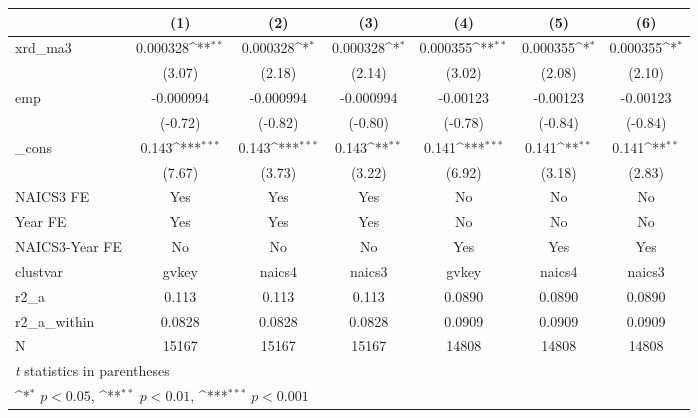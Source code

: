 {
\def\sym#1{\ifmmode^{#1}\else\(^{#1}\)\fi}
\begin{tabular}{l*{6}{c}}
\hline\hline
            &\multicolumn{1}{c}{(1)}         &\multicolumn{1}{c}{(2)}         &\multicolumn{1}{c}{(3)}         &\multicolumn{1}{c}{(4)}         &\multicolumn{1}{c}{(5)}         &\multicolumn{1}{c}{(6)}         \\
\hline
xrd\_ma3     &    0.000328\sym{**} &    0.000328\sym{*}  &    0.000328\sym{*}  &    0.000355\sym{**} &    0.000355\sym{*}  &    0.000355\sym{*}  \\
            &      (3.07)         &      (2.18)         &      (2.14)         &      (3.02)         &      (2.08)         &      (2.10)         \\
[1em]
emp         &   -0.000994         &   -0.000994         &   -0.000994         &    -0.00123         &    -0.00123         &    -0.00123         \\
            &     (-0.72)         &     (-0.82)         &     (-0.80)         &     (-0.78)         &     (-0.84)         &     (-0.84)         \\
[1em]
\_cons      &       0.143\sym{***}&       0.143\sym{***}&       0.143\sym{**} &       0.141\sym{***}&       0.141\sym{**} &       0.141\sym{**} \\
            &      (7.67)         &      (3.73)         &      (3.22)         &      (6.92)         &      (3.18)         &      (2.83)         \\
[1em]
NAICS3 FE   &         Yes         &         Yes         &         Yes         &          No         &          No         &          No         \\
[1em]
Year FE     &         Yes         &         Yes         &         Yes         &          No         &          No         &          No         \\
[1em]
NAICS3-Year FE&          No         &          No         &          No         &         Yes         &         Yes         &         Yes         \\
\hline
clustvar    &       gvkey         &      naics4         &      naics3         &       gvkey         &      naics4         &      naics3         \\
r2\_a        &       0.113         &       0.113         &       0.113         &      0.0890         &      0.0890         &      0.0890         \\
r2\_a\_within &      0.0828         &      0.0828         &      0.0828         &      0.0909         &      0.0909         &      0.0909         \\
N           &       15167         &       15167         &       15167         &       14808         &       14808         &       14808         \\
\hline\hline
\multicolumn{7}{l}{\footnotesize \textit{t} statistics in parentheses}\\
\multicolumn{7}{l}{\footnotesize \sym{*} \(p<0.05\), \sym{**} \(p<0.01\), \sym{***} \(p<0.001\)}\\
\end{tabular}
}
